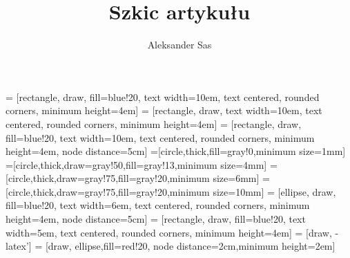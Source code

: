 \documentclass[11pt]{article}
\author{Aleksander Sas}
\title{Szkic artykułu}
\begin{document}
 = [rectangle, draw, fill=blue!20, text width=10em, text centered, rounded corners, minimum height=4em]
 = [rectangle, draw, text width=10em, text centered, rounded corners, minimum height=4em]
 = [rectangle, draw, fill=blue!20, text width=10em, text centered, rounded corners, minimum height=4em, node distance=5cm]
=[circle,thick,fill=gray!0,minimum size=1mm]
=[circle,thick,draw=gray!50,fill=gray!13,minimum size=4mm]
=[circle,thick,draw=gray!75,fill=gray!20,minimum size=6mm]
=[circle,thick,draw=gray!75,fill=gray!20,minimum size=10mm]
 = [ellipse, draw, fill=blue!20, text width=6em, text centered, rounded corners, minimum height=4em, node distance=5cm]
 = [rectangle, draw, fill=blue!20, text width=5em, text centered, rounded corners, minimum height=4em]
 = [draw, -latex']
 = [draw, ellipse,fill=red!20, node distance=2cm,minimum height=2em]

\maketitle
\tableofcontents
\end{document}
